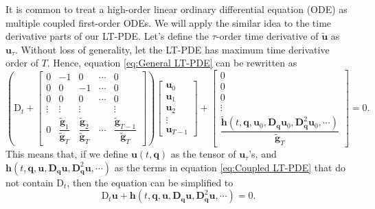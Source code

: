 \documentclass[preprint, 12pt]{revtex4-2}
\numberwithin{equation}{section}
\begin{document}
It is common to treat a high-order linear ordinary differential equation (ODE) as multiple coupled first-order ODEs. We will apply the similar idea to the time derivative parts of our LT-PDE. Let's define the $\tau$-order time derivative of $\tilde{\mathbf{u}}$ as $\mathbf{u}_\tau$. Without loss of generality, let the LT-PDE has maximum time derivative order of $T$. Hence, equation \ref{eq:General LT-PDE} can be rewritten as
\begin{equation}\label{eq:Coupled LT-PDE}
    \left(
        \text{D}_t + 
        \begin{bmatrix}
            0 &-1 & 0 & \cdots & 0 \\
            0 & 0 &-1 & \cdots & 0 \\
            0 & 0 & 0 & \cdots & 0 \\
            \vdots & \vdots & \vdots & & \vdots \\
            0 & \dfrac{\tilde{\mathbf{g}}_1}{\tilde{\mathbf{g}}_{T}} & \dfrac{\tilde{\mathbf{g}}_2}{\tilde{\mathbf{g}}_{T}} & \cdots & \dfrac{\tilde{\mathbf{g}}_{T-1}}{\tilde{\mathbf{g}}_{T}} 
        \end{bmatrix}
    \right)
    \begin{bmatrix}
        \mathbf{u}_0 \\ \mathbf{u}_1 \\ \mathbf{u}_2 \\ \vdots \\ \mathbf{u}_{T-1}
    \end{bmatrix} +
    \begin{bmatrix}
        0 \\ 0 \\ 0 \\ \vdots \\ \dfrac{\tilde{\mathbf{h}}(t, \mathbf{q}, \mathbf{u}_0, \mathbf{D}_\mathbf{q}\mathbf{u}_0, \mathbf{D}_\mathbf{q}^2\mathbf{u}_0, \cdots)}{\tilde{\mathbf{g}}_{T}}
    \end{bmatrix} = 0.
\end{equation}
This means that, if we define $\mathbf{u}(t,\mathbf{q})$ as the tensor of $\mathbf{u}_\tau$'s, and $\mathbf{h}(t, \mathbf{q}, \mathbf{u}, \mathbf{D}_\mathbf{q}\mathbf{u}, \mathbf{D}_\mathbf{q}^2\mathbf{u}, \cdots)$ as the terms in equation \ref{eq:Coupled LT-PDE} that do not contain $\text{D}_t$, then the equation can be simplified to
\begin{equation}\label{eq:LT-PDE}
    \text{D}_t\mathbf{u} + \mathbf{h}(t, \mathbf{q}, \mathbf{u}, \mathbf{D}_\mathbf{q}\mathbf{u}, \mathbf{D}_\mathbf{q}^2\mathbf{u}, \cdots) = 0.
\end{equation}
\end{document}
